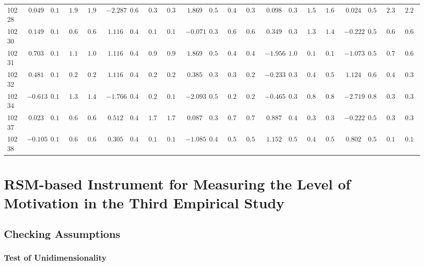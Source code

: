 \begin{landscape}
{\begin{longtable}{l|rrrr|rrrr|rrrr|rrrr|rrrr}
10228&$ 0.049$&$0.160$&$1.940$&$1.938$&$-2.287$&$0.601$&$0.351$&$0.333$&$ 1.869$&$0.531$&$0.406$&$0.381$&$ 0.098$&$0.359$&$1.548$&$1.637$&$ 0.024$&$0.513$&$2.322$&$2.252$\tabularnewline
10230&$ 0.149$&$0.160$&$0.660$&$0.668$&$ 1.116$&$0.430$&$0.165$&$0.163$&$-0.071$&$0.399$&$0.641$&$0.645$&$ 0.349$&$0.386$&$1.326$&$1.429$&$-0.222$&$0.517$&$0.640$&$0.621$\tabularnewline
10231&$ 0.703$&$0.173$&$1.179$&$1.084$&$ 1.116$&$0.430$&$0.934$&$0.913$&$ 1.869$&$0.531$&$0.438$&$0.479$&$-1.956$&$1.082$&$0.145$&$0.149$&$-1.073$&$0.572$&$0.700$&$0.652$\tabularnewline
10232&$ 0.481$&$0.164$&$0.289$&$0.281$&$ 1.116$&$0.430$&$0.227$&$0.222$&$ 0.385$&$0.386$&$0.302$&$0.298$&$-0.233$&$0.355$&$0.496$&$0.538$&$ 1.124$&$0.635$&$0.408$&$0.398$\tabularnewline
10234&$-0.613$&$0.179$&$1.334$&$1.408$&$-1.766$&$0.470$&$0.225$&$0.193$&$-2.093$&$0.524$&$0.271$&$0.262$&$-0.465$&$0.378$&$0.843$&$0.894$&$-2.719$&$0.854$&$0.301$&$0.304$\tabularnewline
10237&$ 0.023$&$0.160$&$0.698$&$0.689$&$ 0.512$&$0.443$&$1.727$&$1.715$&$ 0.087$&$0.394$&$0.793$&$0.764$&$ 0.887$&$0.493$&$0.390$&$0.351$&$-0.222$&$0.517$&$0.323$&$0.344$\tabularnewline
10238&$-0.105$&$0.162$&$0.666$&$0.673$&$ 0.305$&$0.437$&$0.108$&$0.111$&$-1.085$&$0.424$&$0.563$&$0.535$&$ 1.152$&$0.567$&$0.480$&$0.520$&$ 0.802$&$0.573$&$0.197$&$0.151$\tabularnewline
\hline
\end{longtable}}\end{landscape}

\newpage
\section{RSM-based Instrument for Measuring the Level of Motivation in the Third Empirical Study}
\label{sec:irt-level-motivation-third-study}


\subsection{Checking Assumptions}

\subsubsection*{Test of Unidimensionality}

